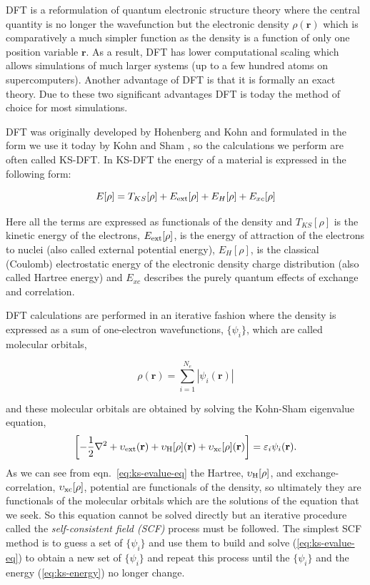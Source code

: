 \documentclass[../main.tex]{subfiles}
\begin{document}
DFT is a reformulation of quantum electronic structure theory where the central quantity is no longer the wavefunction but the electronic density $\rho(\mathbf{r})$ which is comparatively a much simpler function as the density is a function of only one position variable $\mathbf{r}$. As a result, DFT has lower computational scaling which allows simulations of much larger systems (up to a few hundred atoms on supercomputers). Another advantage of DFT is that it is formally an exact theory. Due to these two significant advantages DFT is today the method of choice for most simulations. 

DFT was originally developed by Hohenberg and Kohn \cite{parr,ph1964B864} and formulated in the form we use it today by Kohn and Sham \cite{wk1965A1133}, so the calculations we perform are often called KS-DFT. In KS-DFT the energy of a material is expressed in the following form:

\begin{equation}
    \label{eq:ks-energy}
    E[\rho] = T_{KS}[\rho] + E_{\rm ext}[\rho] + E_{H}[\rho] + E_{xc}[\rho]
\end{equation}

Here all the terms are expressed as functionals of the density and $T_{KS}[\rho]$ is the kinetic energy of the electrons, $ E_{\rm ext}[\rho]$, is the energy of attraction of the electrons to nuclei (also called external potential energy), $E_{H}[\rho]$, is the classical (Coulomb) electrostatic energy of the electronic density charge distribution (also called Hartree energy) and $E_{xc} $ describes the purely quantum effects of exchange and correlation. 

DFT calculations are performed in an iterative fashion where the density is expressed as a sum of one-electron wavefunctions, $\{ \psi_i \}$, which are called molecular orbitals,

\begin{equation}
    \rho(\mathbf{r}) = \sum_{i=1}^{N_e} | \psi_i(\mathbf{r})|
\end{equation}

and these molecular orbitals are obtained by solving the Kohn-Sham eigenvalue equation,
\begin{equation}
   \left [ -\frac{1}{2}\nabla^2 + \upsilon_{\rm ext}(\mathbf{r}) 
    + \upsilon_{\rm H}[\rho](\mathbf{r}) 
    + \upsilon_{\rm xc}[\rho](\mathbf{r}) \right ]
    = \varepsilon_i \psi_i(\mathbf{r}).
    \label{eq:ks-evalue-eq}
\end{equation} 
As we can see from eqn.~\ref{eq:ks-evalue-eq} the Hartree, $\upsilon_{\rm H}[\rho]$, and exchange-correlation, $\upsilon_{\rm xc}[\rho]$, potential are functionals of the density, so ultimately they are functionals of the molecular orbitals 
which are the solutions of the equation that we seek. So this equation cannot be solved directly but an iterative procedure called the \emph{self-consistent field (SCF)} process must be followed. The simplest SCF method is to guess a set of $\{ \psi_i \}$ and use them to build and solve (\ref{eq:ks-evalue-eq}) to obtain a new set of $\{ \psi_i \}$ and repeat this process until the $\{ \psi_i \}$ and the energy 
(\ref{eq:ks-energy})
no longer change.
\end{document}
